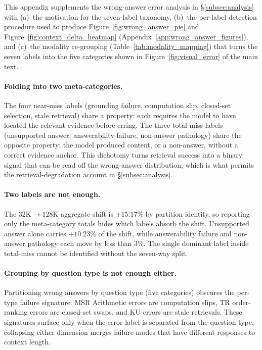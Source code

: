 \documentclass{article}
\begin{document}
This appendix supplements the wrong-answer error analysis in \S\ref{subsec:analysis} with
(a)~the motivation for the seven-label taxonomy, (b)~the per-label detection procedure used
to produce Figure~\ref{fig:wrong_answer_pie} and Figure~\ref{fig:context_delta_heatmap}
(Appendix~\ref{app:wrong_answer_figures}), and (c)~the modality re-grouping
(Table~\ref{tab:modality_mapping}) that turns the seven labels into the five categories shown in
Figure~\ref{fig:visual_error} of the main text.

\paragraph{Folding into two meta-categories.}
The four near-miss labels (grounding failure, computation slip,
closed-set selection, stale retrieval) share a property: each requires
the model to have located the relevant evidence before erring.
The three total-miss labels (unsupported answer, answerability
failure, non-answer pathology) share the opposite property: the model
produced content, or a non-answer, without a correct evidence anchor.
This dichotomy turns retrieval success into a binary signal that can
be read off the wrong-answer distribution, which is what permits the
retrieval-degradation account in \S\ref{subsec:analysis}.

\paragraph{Two labels are not enough.}
The $32\text{K}\!\to\!128\text{K}$ aggregate shift is $\pm 15.17\%$
by partition identity, so reporting only the meta-category totals
hides which labels absorb the shift. Unsupported answer alone carries
$+10.23\%$ of the shift, while answerability failure and non-answer
pathology each move by less than $3\%$. The single dominant label
inside total-miss cannot be identified without the seven-way split.

\paragraph{Grouping by question type is not enough either.}
Partitioning wrong answers by question type (five categories) obscures
the per-type failure signature: MSR Arithmetic errors are computation
slips, TR order-ranking errors are closed-set swaps, and KU errors are stale
retrievals. These signatures surface only when the error label is
separated from the question type; collapsing either dimension merges
failure modes that have different responses to context length.
\end{document}
